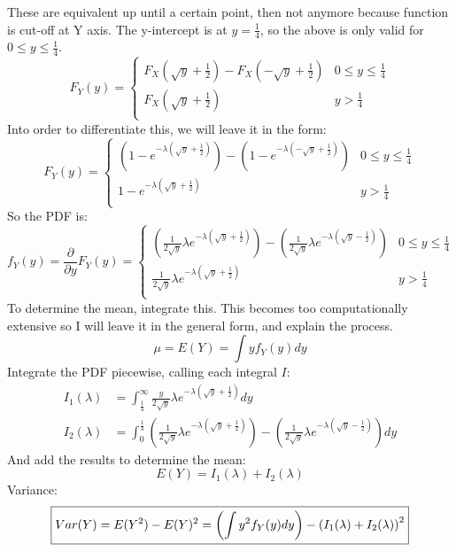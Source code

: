 \documentclass[11pt]{extarticle}
\DeclarePairedDelimiter\autobracket{(}{)}
\newcommand{\br}[1]{\autobracket*{#1}}
\begin{document}
\begin{enumerate}[(a)]


These are equivalent up until a certain point, then not anymore because function is cut-off at Y axis. The y-intercept is at $y=\frac{1}{4}$, so the above is only valid for $0 \leq y \leq \frac{1}{4}$.
$$\boxed{F_Y(y)  = \begin{cases} 
F_X \left(\sqrt{y}+\frac{1}{2} \right) - F_X \left(-\sqrt{y} + \frac{1}{2} \right) & 0 \leq y \leq \frac{1}{4} \\
F_X \left(\sqrt{y}+\frac{1}{2} \right) & y > \frac{1}{4} \\
\end{cases}}$$
Into order to differentiate this, we will leave it in the form: $$F_Y(y)  = \begin{cases} 
\left( 1-e^{-\lambda \left( \sqrt{y} + \frac{1}{2} \right)} \right) - \left( 1-e^{-\lambda \left( -\sqrt{y} + \frac{1}{2} \right)} \right) & 0 \leq y \leq \frac{1}{4} \\
1-e^{-\lambda \left( \sqrt{y} + \frac{1}{2} \right)} & y > \frac{1}{4} \\
\end{cases}$$
So the PDF is:$$\boxed{ f_Y(y) = \frac{\partial}{\partial y} F_Y(y) = \begin{cases} 
\left( \frac{1}{2 \sqrt{y}} \lambda e^{-\lambda \left( \sqrt{y} + \frac{1}{2} \right)} \right) - \left( \frac{1}{2 \sqrt{y}} \lambda e^{-\lambda \left( \sqrt{y} - \frac{1}{2} \right)} \right) & 0 \leq y \leq \frac{1}{4} \\ \frac{1}{2 \sqrt{y}} \lambda e^{-\lambda \left( \sqrt{y} + \frac{1}{2} \right)}  & y > \frac{1}{4} \\
\end{cases} }$$
To determine the mean, integrate this. This becomes too computationally extensive so I will leave it in the general form, and explain the process. $$\mu =  E(Y) = \int yf_Y(y) dy$$ 
Integrate the PDF piecewise, calling each integral $I$: \begin{align*}
I_1(\lambda) & = \int_\frac{1}{4}^{\infty} \frac{y}{2 \sqrt{y}} \lambda e^{-\lambda \left( \sqrt{y} + \frac{1}{2} \right)} dy  \\ 
I_2(\lambda) & = \int_0^{\frac{1}{4}} \left( \frac{1}{2 \sqrt{y}} \lambda e^{-\lambda \left( \sqrt{y} + \frac{1}{2} \right)} \right) - \left( \frac{1}{2 \sqrt{y}} \lambda e^{-\lambda \left( \sqrt{y} - \frac{1}{2} \right)} \right) dy   \end{align*}
And add the results to determine the mean: $$\boxed{E(Y)  = I_1(\lambda) + I_2(\lambda)}$$
Variance: $$ \boxed{Var(Y) = E(Y^2) - E(Y)^2  = \left( \int y^2f_Y(y) dy  \right) - \br{ I_1(\lambda) + I_2(\lambda) }^2 }$$ 


\end{enumerate}
\end{document}

